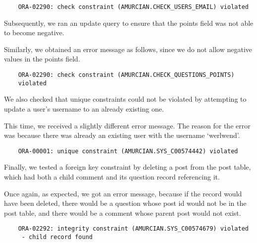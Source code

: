 \begin{verbatim}
	ORA-02290: check constraint (AMURCIAN.CHECK_USERS_EMAIL) violated
\end{verbatim}

Subsequently, we ran an update query to ensure that the points field was not able to become negative.


Similarly, we obtained an error message as follows, since we do not allow negative values in the points field.

\begin{verbatim}
	ORA-02290: check constraint (AMURCIAN.CHECK_QUESTIONS_POINTS)
	violated
\end{verbatim}

We also checked that unique constraints could not be violated by attempting to update a user's username to an already existing one.


This time, we received a slightly different error message. The reason for the error was because there was already an existing user with the username `werlwend'.

\begin{verbatim}
	ORA-00001: unique constraint (AMURCIAN.SYS_C00574442) violated
\end{verbatim}

Finally, we tested a foreign key constraint by deleting a post from the post table, which had both a child comment and its question record referencing it.


Once again, as expected, we got an error message, because if the record would have been deleted, there would be a question whose post id would not be in the post table, and there would be a comment whose parent post would not exist.

\begin{verbatim}
	ORA-02292: integrity constraint (AMURCIAN.SYS_C00574679) violated
	 - child record found
\end{verbatim}
